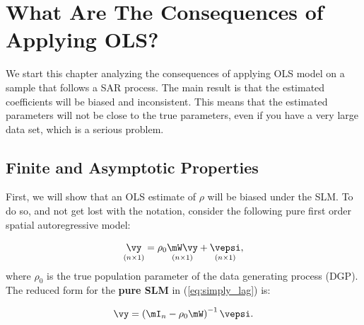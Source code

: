 \documentclass[english,12pt]{book}\usepackage[]{graphicx}\usepackage[]{xcolor}
\begin{document}





\section{What Are The Consequences of Applying OLS?}\label{sec:consequences_slm}

We start this chapter analyzing the consequences of applying OLS model on a sample that follows a SAR process. The main result is that the estimated coefficients will be biased and inconsistent. This means that the estimated parameters will not be close to the true parameters, even if you have a very large data set, which is a serious problem.

\subsection{Finite and Asymptotic Properties}

First, we will show that an OLS estimate of $\rho$ will be biased under the SLM. To do so, and not get lost with the notation, consider the following pure first order spatial autoregressive model:

\begin{equation}\label{eq:simply_lag}
\underset{(n\times 1)}{\vy} = \rho_0\underset{(n\times 1)}{\mW\vy} + \underset{(n\times 1)}{\vepsi},
\end{equation}
%
where $\rho_0$ is the true population parameter of the data generating process (DGP). The reduced form for the \textbf{pure SLM} in (\ref{eq:simply_lag}) is:

\begin{equation}\label{eq:reduced_form_pure_slm}
\vy =\left(\mI_n - \rho_0\mW\right)^{-1}\vepsi.
\end{equation}
\end{document}
